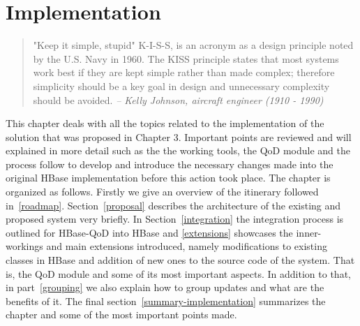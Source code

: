 
\chapter{Implementation}

\label{ch:implemenation}

\begin{quotation}
"Keep it simple, stupid" K-I-S-S, is an acronym as a design principle noted by the U.S. Navy in 1960. The KISS principle states that most systems work best if they are kept simple rather than made complex; therefore simplicity should be a key goal in design and unnecessary complexity should be avoided.
{\small\it -- Kelly Johnson, aircraft engineer (1910 - 1990)}
\end{quotation}


This chapter deals with all the topics related to the implementation of the solution that was proposed in Chapter 3. Important points are reviewed and will explained in more detail such as the the working tools, the QoD module and the process follow to develop and introduce the necessary changes made into the original HBase implementation before this action took place. The chapter is organized as follows. Firstly we give an overview of the itinerary followed in~\ref{roadmap}. Section~\ref{proposal} describes the architecture of the existing and proposed system very briefly. In Section~\ref{integration} the integration process is outlined for HBase-QoD into HBase and \ref{extensions} showcases the inner-workings and main extensions introduced, namely modifications to existing classes in HBase and addition of new ones to the source code of the system. That is, the QoD module and some of its most important aspects. In addition to that, in part~\ref{grouping} we also explain how to group updates and what are the benefits of it. The final section~\ref{summary-implementation} summarizes the chapter and some of the most important points made.


